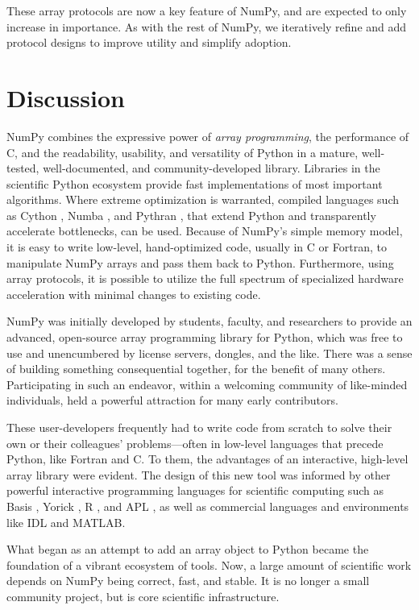 \documentclass[twocolumn]{article}
\begin{document}
These array protocols are now a key feature of NumPy, and are expected to only
increase in importance.  As with the rest of NumPy, we iteratively refine and
add protocol designs to improve utility and simplify adoption. 

\section*{Discussion}

NumPy combines the expressive power of \emph{array programming},
the performance of C, and
the readability, usability, and versatility of Python in a mature,
well-tested, well-documented, and community-developed library.
Libraries in the scientific Python ecosystem provide fast implementations of most important algorithms.
Where extreme optimization is warranted, compiled languages such as
Cython \cite{behnel2011cython}, Numba \cite{Lam:2015:NLP:2833157.2833162},
and Pythran \cite{guelton2015pythran}, that
extend Python and transparently accelerate bottlenecks, can be
used.
Because of NumPy's simple memory model, it is easy to write low-level, hand-optimized code, usually in C
or Fortran, to manipulate NumPy arrays and pass them back to
Python.
Furthermore, using array protocols, it is possible to utilize the full
spectrum of specialized hardware acceleration with minimal changes to
existing code.

NumPy was initially developed by students, faculty, and researchers to
provide an advanced, open-source array programming library for Python,
which was free to use and unencumbered by license servers, dongles, and the like.
There was a sense of building something consequential together,
for the benefit of many others.  Participating in
such an endeavor, within a welcoming community of like-minded
individuals, held a powerful attraction for many early contributors.

These user-developers frequently had to write code from scratch to solve
their own or their colleagues' problems---often in low-level languages
that precede Python, like Fortran \cite{dongarra2008netlib} and C.
To them, the advantages of an interactive, high-level array library
were evident. The design of this new tool was informed by other
powerful interactive programming languages for scientific computing
such as Basis \cite{dubois1989basis}, Yorick \cite{munro1995using}, R \cite{ihaka1996r},
and APL \cite{iverson1962programming},
as well as commercial languages and environments like IDL and {MATLAB}.

What began as an attempt to add an array object to Python became the
foundation of a vibrant ecosystem of tools.  Now, a large amount of
scientific work depends on NumPy being correct, fast, and stable.  It
is no longer a small community project, but is core scientific
infrastructure.
\end{document}
